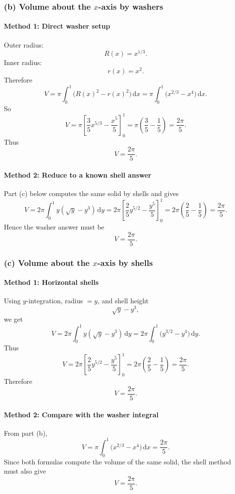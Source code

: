 \documentclass[12pt]{article}
\newcommand{\dd}{\,\mathrm{d}}
\begin{document}
\bigskip

\subsubsection{(b) Volume about the \(x\)-axis by washers}

\paragraph{Method 1: Direct washer setup}
Outer radius:
\[
R(x)=x^{1/3}.
\]
Inner radius:
\[
r(x)=x^2.
\]
Therefore
\[
V
=
\pi\int_0^1\bigl(R(x)^2-r(x)^2\bigr)\dd x
=
\pi\int_0^1\bigl(x^{2/3}-x^4\bigr)\dd x.
\]
So
\[
V
=
\pi\left[\frac35 x^{5/3}-\frac{x^5}{5}\right]_0^1
=
\pi\left(\frac35-\frac15\right)
=
\frac{2\pi}{5}.
\]
Thus
\[
\boxed{V=\frac{2\pi}{5}.}
\]

\paragraph{Method 2: Reduce to a known shell answer}
Part (c) below computes the same solid by shells and gives
\[
V=2\pi\int_0^1 y(\sqrt y-y^3)\dd y
=
2\pi\left[\frac{2}{5}y^{5/2}-\frac{y^5}{5}\right]_0^1
=
2\pi\left(\frac25-\frac15\right)
=
\frac{2\pi}{5}.
\]
Hence the washer answer must be
\[
\boxed{V=\frac{2\pi}{5}.}
\]

\bigskip

\subsubsection{(c) Volume about the \(x\)-axis by shells}

\paragraph{Method 1: Horizontal shells}
Using \(y\)-integration, radius \(=y\), and shell height
\[
\sqrt y-y^3,
\]
we get
\[
V
=
2\pi\int_0^1 y(\sqrt y-y^3)\dd y
=
2\pi\int_0^1 \bigl(y^{3/2}-y^4\bigr)\dd y.
\]
Thus
\[
V
=
2\pi\left[\frac{2}{5}y^{5/2}-\frac{y^5}{5}\right]_0^1
=
2\pi\left(\frac25-\frac15\right)
=
\frac{2\pi}{5}.
\]
Therefore
\[
\boxed{V=\frac{2\pi}{5}.}
\]

\paragraph{Method 2: Compare with the washer integral}
From part (b),
\[
V=\pi\int_0^1 \bigl(x^{2/3}-x^4\bigr)\dd x=\frac{2\pi}{5}.
\]
Since both formulas compute the volume of the same solid, the shell method must also give
\[
\boxed{V=\frac{2\pi}{5}.}
\]
\end{document}
